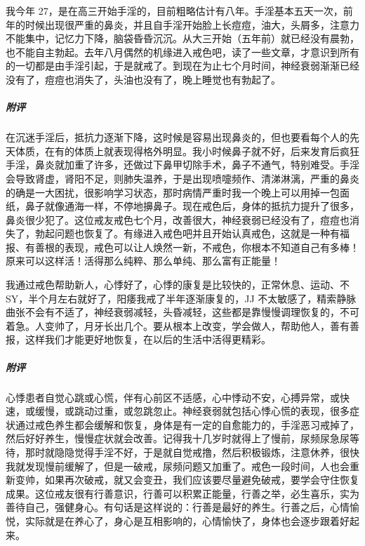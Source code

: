\begin{case}[神经衰弱]
    我今年 27，是在高三开始手淫的，目前粗略估计有八年。手淫基本五天一次，前年的时候出现很严重的鼻炎，并且自手淫开始脸上长痘痘，油大，头屑多，注意力不能集中，记忆力下降，脑袋昏昏沉沉。从大三开始（五年前）就已经没有晨勃，也不能自主勃起。去年八月偶然的机缘进入戒色吧，读了一些文章，才意识到所有的一切都是由手淫引起，于是就戒了。到现在为止七个月时间，神经衰弱渐渐已经没有了，痘痘也消失了，头油也没有了，晚上睡觉也有勃起了。
    \subparagraph{附评} 在沉迷手淫后，抵抗力逐渐下降，这时候是容易出现鼻炎的，但也要看每个人的先天体质，在有的体质上就表现得格外明显。我小时候鼻子就不好，后来发育后疯狂手淫，鼻炎就加重了许多，还做过下鼻甲切除手术，鼻子不通气，特别难受。手淫会导致肾虚，肾阳不足，则肺失温养，于是出现喷嚏频作、清涕淋漓，严重的鼻炎的确是一大困扰，很影响学习状态，那时病情严重时我一个晚上可以用掉一包面纸，鼻子就像通海一样，不停地擤鼻子。现在戒色后，身体的抵抗力提升了很多，鼻炎很少犯了。这位戒友戒色七个月，改善很大，神经衰弱已经没有了，痘痘也消失了，勃起问题也恢复了。有缘进入戒色吧并且开始认真戒色，这就是一种有福报、有善根的表现，戒色可以让人焕然一新，不戒色，你根本不知道自己有多棒！原来可以这样活！活得那么纯粹、那么单纯、那么富有正能量！
\end{case}

\begin{case}[神经衰弱]
    我通过戒色帮助新人，心悸好了，心悸的康复是比较快的，正常休息、运动、不 SY，半个月左右就好了，阳痿我戒了半年逐渐康复的，JJ 不太敏感了，精索静脉曲张不会有不适了，神经衰弱减轻，头昏减轻，这些都是靠慢慢调理恢复的，不可着急。人变帅了，月牙长出几个。要从根本上改变，学会做人，帮助他人，善有善报，这样我们才能更好地恢复，在以后的生活中活得更精彩。
    \subparagraph{附评} 心悸患者自觉心跳或心慌，伴有心前区不适感，心中悸动不安，心搏异常，或快速，或缓慢，或跳动过重，或忽跳忽止。神经衰弱就包括心悸心慌的表现，很多症状通过戒色养生都会缓解和恢复，身体是有一定的自愈能力的，手淫恶习戒掉了，然后好好养生，慢慢症状就会改善。记得我十几岁时就得上了慢前，尿频尿急尿等待，那时就隐隐觉得手淫不好，于是就自觉戒撸，然后积极锻炼，注意休养，很快我就发现慢前缓解了，但是一破戒，尿频问题又加重了。戒色一段时间，人也会重新变帅，如果再次破戒，就又会变丑，我们应该要尽量避免破戒，要学会守住恢复成果。这位戒友很有行善意识，行善可以积累正能量，行善之举，必生喜乐，实为善待自己，强健身心。有句话是这样说的：行善是最好的养生。行善之后，心情愉悦，实际就是在养心了，身心是互相影响的，心情愉快了，身体也会逐步跟着好起来。
\end{case}

